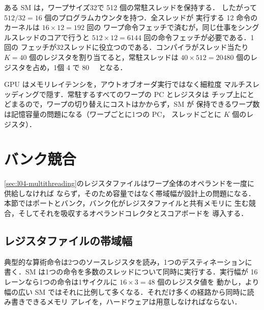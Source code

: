 \documentclass[../main.tex]{subfiles}
\begin{document}
\begin{example}
  \label{ex:l04-resources}
  ある SM は，ワープサイズ32で \num{512} 個の常駐スレッドを保持する．
  したがって $512 / 32 = 16$ 個のプログラムカウンタを持つ．全スレッドが
  実行する \num{12} 命令のカーネルは $16 \times 12 = 192$ 回の
  ワープ命令フェッチで済むが，同じ仕事をシングルスレッドのコアで行うと
  $512 \times 12 = \num{6144}$ 回の命令フェッチが必要である．1回の
  フェッチが32スレッドに役立つのである．コンパイラがスレッド当たり
  $K = 40$ 個のレジスタを割り当てると，常駐スレッドは
  $40 \times 512 = \num{20480}$ 個のレジスタを占め，1個
  \SI{4}{\byte} で \SI{80}{\kibi\byte} となる．
\end{example}

\begin{keypoint}
  GPU はメモリレイテンシを，アウトオブオーダ実行ではなく細粒度
  マルチスレッディングで隠す．常駐するすべてのワープの PC とレジスタは
  チップ上にとどまるので，ワープの切り替えにコストはかからず，SM が
  保持できるワープ数は記憶容量の問題になる（ワープごとに1つの PC，
  スレッドごとに $K$ 個のレジスタ）．
\end{keypoint}

\section{バンク競合}
\label{sec:l04-bank-conflicts}

\cref{sec:l04-multithreading}のレジスタファイルはワープ全体のオペランドを一度に供給しなければ
ならず，そのため容量ではなく帯域幅が設計上の問題になる．
本節ではポートとバンク，バンク化がレジスタファイルと共有メモリに
生む競合，そしてそれを吸収するオペランドコレクタとスコアボードを
導入する．

\subsection{レジスタファイルの帯域幅}

典型的な算術命令は2つのソースレジスタを読み，1つのデスティネーションに
書く．SM は1つの命令を多数のスレッドについて同時に実行する．実行幅が
16レーンなら1つの命令は1サイクルに $16 \times 3 = 48$ 個のレジスタ値を
動かし，より幅の広い SM ではそれに比例して多くなる．それだけ多くの経路から同時に読み書きできるメモリ
アレイを，ハードウェアは用意しなければならない．
\end{document}
